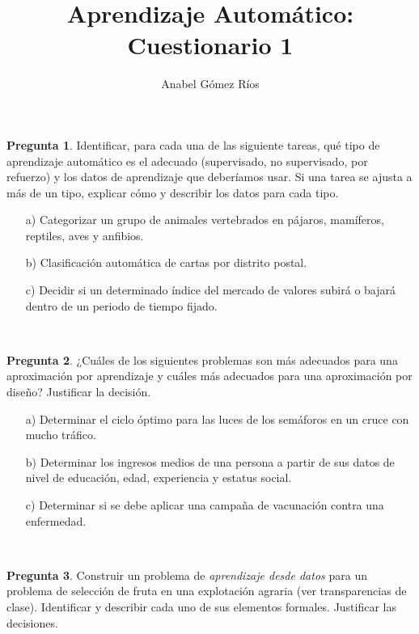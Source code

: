 \documentclass[12pt]{article}
\title{Aprendizaje Automático: Cuestionario 1}
\author{Anabel G\'omez R\'ios}
\theoremstyle{definition}
\begin{document}
\maketitle

\newtheorem{pregunta}{Pregunta}

\begin{pregunta}
Identificar, para cada una de las siguiente tareas, qué tipo de aprendizaje automático es el adecuado (supervisado, no supervisado, por refuerzo) y los datos de aprendizaje que deberíamos usar. Si una tarea se ajusta a más de un tipo, explicar cómo y describir los datos para cada tipo.
\begin{enumerate}
\item[a)] Categorizar un grupo de animales vertebrados en pájaros, mamíferos, reptiles, aves y anfibios.
\item[b)] Clasificación automática de cartas por distrito postal.
\item[c)] Decidir si un determinado índice del mercado de valores subirá o bajará dentro de un periodo de tiempo fijado.
\end{enumerate}
\textit{ }\\


\end{pregunta}

\begin{pregunta}
¿Cuáles de los siguientes problemas son más adecuados para una aproximación por aprendizaje y cuáles más adecuados para una aproximación por diseño? Justificar la decisión.
\begin{enumerate}
\item[a)] Determinar el ciclo óptimo para las luces de los semáforos en un cruce con mucho tráfico.
\item[b)] Determinar los ingresos medios de una persona a partir de sus datos de nivel de educación, edad, experiencia y estatus social.
\item[c)] Determinar si se debe aplicar una campaña de vacunación contra una enfermedad.
\end{enumerate}
\textit{ }\\

\end{pregunta}

\begin{pregunta}
Construir un problema de \textit{aprendizaje desde datos} para un problema de selección de fruta en una explotación agraria (ver transparencias de clase). Identificar y describir cada uno de sus elementos formales. Justificar las decisiones.\\


\end{pregunta}
\end{document}
